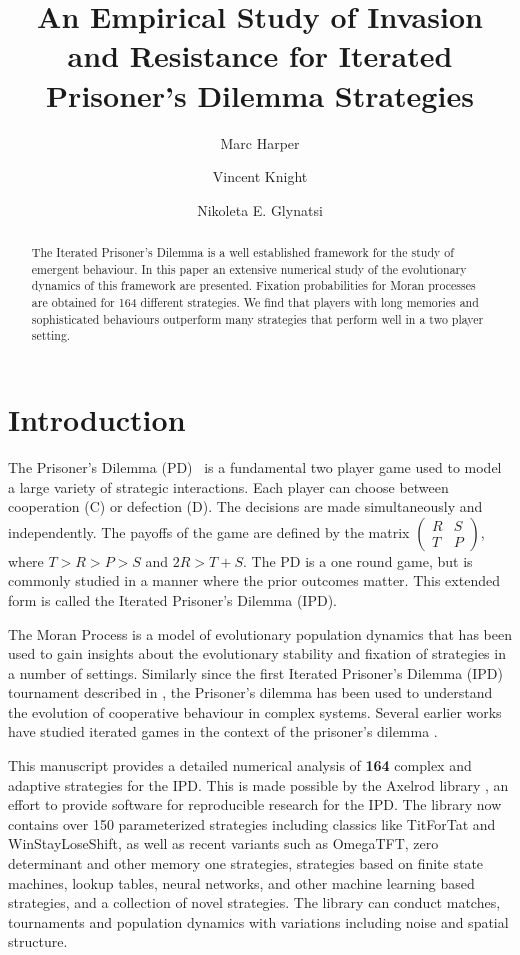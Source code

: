 \documentclass{article}
\title{An Empirical Study of Invasion and Resistance for Iterated Prisoner's Dilemma Strategies}
\author{Marc Harper \and Vincent Knight \and Nikoleta E. Glynatsi} %
\date{}
\begin{document}
\maketitle

\begin{abstract}
    The Iterated Prisoner's Dilemma is a well established framework for
    the study of emergent behaviour. In this paper an extensive numerical
    study of the evolutionary dynamics of this framework are presented. Fixation
    probabilities for Moran processes are obtained for 164
    different strategies. We find that players with long memories and
    sophisticated behaviours outperform many strategies that perform well
    in a two player setting.
\end{abstract}

\section{Introduction}\label{sec:introduction}

The Prisoner's Dilemma (PD)~\cite{Flood1958} is a fundamental two player game 
used to model a large variety of strategic interactions. Each player can choose
between cooperation (C) or defection (D). The decisions are made simultaneously
and independently. The payoffs of
the game are defined by the matrix $\begin{pmatrix} R & S \\ T & P
\end{pmatrix}$, where $T > R > P > S$ and $2R > T + S$. The PD is a one 
round game, but is commonly studied in a manner where the prior outcomes 
matter. This extended form is called the Iterated Prisoner's 
Dilemma (IPD). 

The Moran Process \cite{Moran1957} is a model of
evolutionary population dynamics that has been used to gain insights about the
evolutionary stability and fixation of strategies in a number of settings.
Similarly since the first Iterated Prisoner's Dilemma (IPD) tournament described in
\cite{Axelrod1980a}, the Prisoner's dilemma has been used to understand the
evolution of cooperative behaviour in complex systems. Several earlier
works have studied iterated games in the context of the prisoner's dilemma
\cite{Nowak} \cite{Stewart2012}.

This manuscript provides a detailed numerical analysis of \textbf{164}
complex and adaptive strategies for the IPD\@. This is made possible
by the Axelrod library \cite{axelrodproject}, an effort to provide
software for reproducible research for the IPD. The library now contains over 150
parameterized strategies including classics like TitForTat and WinStayLoseShift,
as well as recent variants such as OmegaTFT, zero determinant and other memory one strategies,
strategies based on finite state machines, lookup tables, neural networks,
and other machine learning based strategies, and a collection of novel strategies.
The library can conduct matches, tournaments and population dynamics
with variations including noise and spatial structure.
\end{document}
